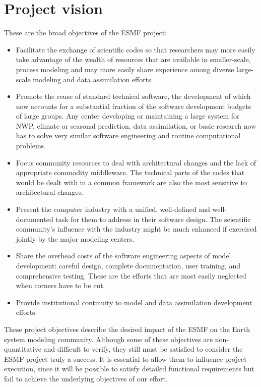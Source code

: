 \section{Project vision}
\label{sec:project_vision}

These are the broad objectives of the ESMF project:

\begin{itemize}
  
\item Facilitate the exchange of scientific codes so that researchers
  may more easily take advantage of the wealth of resources that are
  available in smaller-scale, process modeling and may more easily
  share experience among diverse large-scale modeling and data
  assimilation efforts.
  
\item Promote the reuse of standard technical software, the
  development of which now accounts for a substantial fraction of the
  software development budgets of large groups.  Any center developing
  or maintaining a large system for NWP, climate or seasonal
  prediction, data assimilation, or basic research now has to solve
  very similar software engineering and routine computational
  problems.
  
\item Focus community resources to deal with architectural changes and
  the lack of appropriate commodity middleware. The technical parts of
  the codes that would be dealt with in a common framework are also
  the most sensitive to architectural changes.
  
\item Present the computer industry with a unified, well-defined and
  well-documented task for them to address in their software design.
  The scientific community's influence with the industry might be much
  enhanced if exercised jointly by the major modeling centers.
  
\item Share the overhead costs of the software engineering aspects of
  model development: careful design, complete documentation, user
  training, and comprehensive testing. These are the efforts that are
  most easily neglected when corners have to be cut.
  
\item Provide institutional continuity to model and data assimilation
  development efforts.

\end{itemize}

These project objectives describe the desired impact of the ESMF on
the Earth system modeling community.  Although some of these
objectives are non-quantitative and difficult to verify, they still
must be satisfied to consider the ESMF project truly a success.  It is
essential to allow them to influence project execution, since it will
be possible to satisfy detailed functional requirements but fail to
achieve the underlying objectives of our effort.





